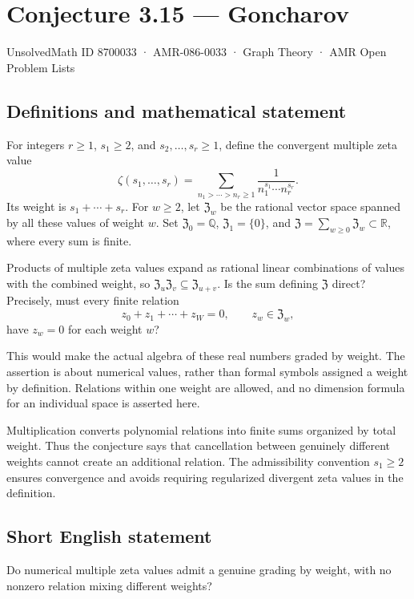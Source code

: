 \documentclass[11pt,a4paper]{article}
\begin{document}
\section*{Conjecture 3.15 — Goncharov}\label{8700033}
{\small UnsolvedMath ID 8700033 · AMR-086-0033 · Graph Theory · AMR Open Problem Lists}
\subsection{Definitions and mathematical statement}
For integers $r\ge1$, $s_1\ge2$, and $s_2,\ldots,s_r\ge1$, define the convergent multiple zeta value
\[
\zeta(s_1,\ldots,s_r)=
\sum_{n_1>\cdots>n_r\ge1}\frac1{n_1^{s_1}\cdots n_r^{s_r}}.
\]
Its weight is $s_1+\cdots+s_r$. For $w\ge2$, let $\mathfrak Z_w$ be the rational vector space spanned by all these values of weight $w$. Set $\mathfrak Z_0=\mathbb Q$, $\mathfrak Z_1=\{0\}$, and $\mathfrak Z=\sum_{w\ge0}\mathfrak Z_w\subset\mathbb R$, where every sum is finite.

Products of multiple zeta values expand as rational linear combinations of values with the combined weight, so $\mathfrak Z_u\mathfrak Z_v\subseteq\mathfrak Z_{u+v}$. Is the sum defining $\mathfrak Z$ direct? Precisely, must every finite relation
\[
z_0+z_1+\cdots+z_W=0,\qquad z_w\in\mathfrak Z_w,
\]
have $z_w=0$ for each weight $w$?

This would make the actual algebra of these real numbers graded by weight. The assertion is about numerical values, rather than formal symbols assigned a weight by definition. Relations within one weight are allowed, and no dimension formula for an individual space is asserted here.

Multiplication converts polynomial relations into finite sums organized by total weight. Thus the conjecture says that cancellation between genuinely different weights cannot create an additional relation. The admissibility convention $s_1\ge2$ ensures convergence and avoids requiring regularized divergent zeta values in the definition.
\subsection{Short English statement}
Do numerical multiple zeta values admit a genuine grading by weight, with no nonzero relation mixing different weights?
\end{document}
